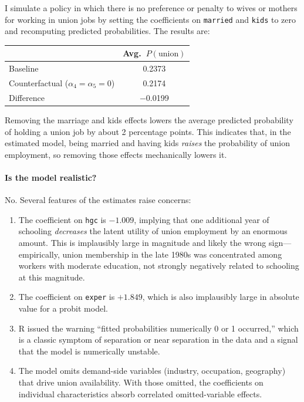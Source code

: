 \documentclass[12pt,english]{article}
\begin{document}
I simulate a policy in which there is no preference or penalty to wives
or mothers for working in union jobs by setting the coefficients on
\texttt{married} and \texttt{kids} to zero and recomputing predicted
probabilities. The results are:

\begin{center}
\begin{tabular}{lc}
\toprule
 & Avg.\ $P(\text{union})$ \\
\midrule
Baseline                 & 0.2373 \\
Counterfactual ($\alpha_4 = \alpha_5 = 0$) & 0.2174 \\
\midrule
Difference                                  & $-$0.0199 \\
\bottomrule
\end{tabular}
\end{center}

Removing the marriage and kids effects lowers the average predicted
probability of holding a union job by about 2 percentage points. This
indicates that, in the estimated model, being married and having kids
\emph{raises} the probability of union employment, so removing those
effects mechanically lowers it.

\paragraph{Is the model realistic?}
No. Several features of the estimates raise concerns:

\begin{enumerate}
  \item The coefficient on \texttt{hgc} is $-1.009$, implying that one
        additional year of schooling \emph{decreases} the latent utility
        of union employment by an enormous amount. This is implausibly
        large in magnitude and likely the wrong sign---empirically,
        union membership in the late 1980s was concentrated among
        workers with moderate education, not strongly negatively related
        to schooling at this magnitude.
  \item The coefficient on \texttt{exper} is $+1.849$, which is also
        implausibly large in absolute value for a probit model.
  \item R issued the warning ``fitted probabilities numerically 0 or 1
        occurred,'' which is a classic symptom of separation or near
        separation in the data and a signal that the model is
        numerically unstable.
  \item The model omits demand-side variables (industry, occupation,
        geography) that drive union availability. With those omitted,
        the coefficients on individual characteristics absorb correlated
        omitted-variable effects.
\end{enumerate}
\end{document}
